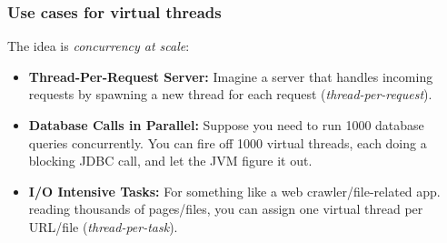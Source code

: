 \documentclass[xcolor={dvipsnames,svgnames},aspectratio=169]{beamer}
\begin{document}
\begin{frame}[fragile]
  \frametitle{Use cases for virtual threads}

  The idea is \emph{concurrency at scale}:

  \begin{itemize}
  \item[\faBook] \textbf{Thread-Per-Request Server:} Imagine a server that handles
    incoming requests by spawning a new thread for each request
    (\emph{thread-per-request}).
  \item[\faBook] \textbf{Database Calls in Parallel:} Suppose you need to run
    1000 database queries concurrently. You can fire off
    1000 virtual threads, each doing a blocking JDBC call, and let the JVM
    figure it out.
  \item[\faBook] \textbf{I/O Intensive Tasks:}  For something like a web
    crawler/file-related app.
    reading thousands of pages/files, you can assign one virtual thread per
    URL/file (\emph{thread-per-task}).
  \end{itemize}

\end{frame}
\end{document}
